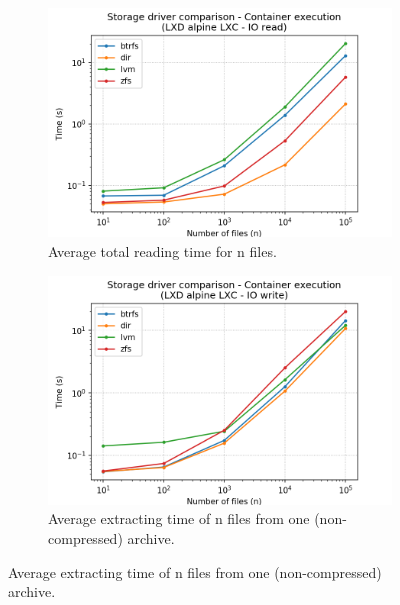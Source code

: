 \begin{figure}[!h]
    
    \begin{subfigure}{.5\textwidth}
      \centering
      \includegraphics[width=\linewidth]{images/storage-driver/storage-driver-execution-LXD-alpine-LXC---IO-read.png}
      \caption{Average total reading time for n files.}
      \label{fig:storage-driver:lxc:io-read-exec}
    \end{subfigure}
    \begin{subfigure}{.5\textwidth}
      \centering
      \includegraphics[width=\linewidth]{images/storage-driver/storage-driver-execution-LXD-alpine-LXC---IO-write.png}
      \caption{Average extracting time of n files from one (non-compressed) archive.}
      \label{fig:storage-driver:lxc:io-write-exec}
    \end{subfigure}
    

\end{figure}
